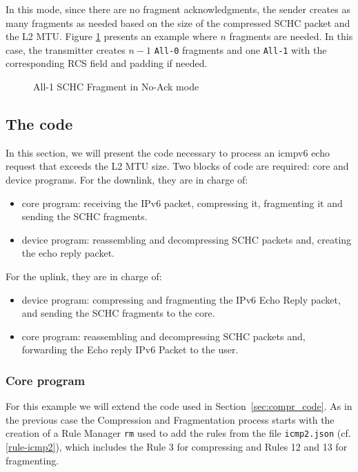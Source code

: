 \documentclass[onecolumn,12pt]{book}
\newcounter{c}
\begin{document}
In this mode, since there are no fragment acknowledgments, the sender creates as many fragments as needed based on the size of the compressed SCHC packet and the L2 MTU.
Figure \ref{fig:NoAck} presents an example where $n$ fragments are needed. 
In this case, the transmitter creates $n-1$ \texttt{All-0} fragments and one \texttt{All-1} with the corresponding RCS field and padding if needed.

\begin{figure}[!ht] 
    \centering 
    
    \caption{All-1 SCHC Fragment in No-Ack mode} 
    \label{fig:NoAck} 
\end{figure} 

\subsection{The code}

In this section, we will present the code necessary to process an icmpv6 echo request that exceeds the L2 MTU size. 
Two blocks of code are required: core and device programs. 
For the downlink, they are in charge of: 

\begin{itemize}
\item core program: receiving the IPv6 packet, compressing it, fragmenting it and sending the SCHC fragments.
\item device program: reassembling and decompressing SCHC packets and, creating the echo reply packet.
\end{itemize} 

For the uplink, they are in charge of: 

\begin{itemize}
\item device program: compressing and fragmenting the IPv6 Echo Reply packet, and sending the SCHC fragments to the core.
\item core program: reassembling and decompressing SCHC packets and, forwarding the Echo reply IPv6 Packet to the user.
\end{itemize} 

\subsubsection{Core program}

For this example we will extend the code used in Section~\ref{sec:compr_code}. 
As in the previous case the Compression and Fragmentation process starts with the creation of a Rule Manager \texttt{rm} used to add the rules from the file \texttt{icmp2.json} (cf. \vref{rule-icmp2}), which includes the Rule 3 for compressing and Rules 12 and 13 for fragmenting.
\end{document}
